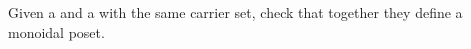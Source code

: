 
\begin{codeexercise}
    Given a  and a  with the same carrier set, check that together they define a monoidal poset.

\end{codeexercise}
